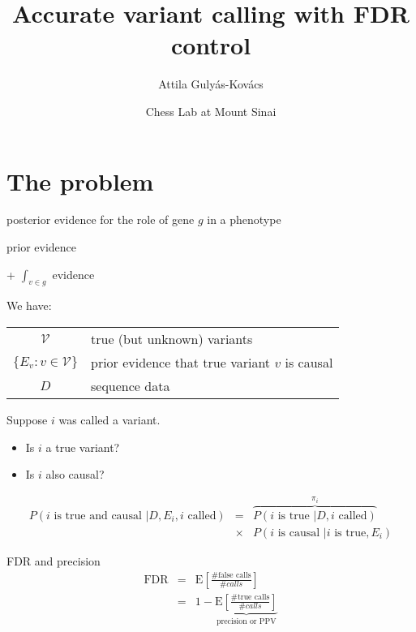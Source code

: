 \documentclass{beamer} %
\title{Accurate variant calling with FDR control}
\author{Attila Guly\'{a}s-Kov\'{a}cs}
\date{Chess Lab at Mount Sinai}
\begin{document}
\begin{frame}[plain, label=title]
\maketitle
\end{frame}

\section{The problem}

\begin{frame}
posterior evidence for the role of gene \(g\) in a phenotype

prior evidence

+ \(\int_{v\in g}\) evidence
\end{frame}

\begin{frame}{}

We have:

\begin{tabular}{cl}
\(\mathcal{V}\) & true (but unknown) variants \\
\(\{E_v : v \in \mathcal{V} \} \) & prior evidence that true variant \(v\) is causal \\
\(D\) & sequence data \\
\end{tabular}

\bigskip

Suppose \(i\) was called a variant.
\begin{itemize}
\item Is \(i\) a true variant?
\item Is \(i\) also causal?
\end{itemize}

\bigskip

\begin{eqnarray*}
P(i \text{ is true and causal } | D, E_i, i \text{ called})
&=&
\overbrace{P(i \text{ is true } | D, i \text{ called})}^{\pi_i} \\
&\times&
P(i \text{ is causal } | i \text{ is true}, E_i)
\end{eqnarray*}
\end{frame}

\begin{frame}{FDR and precision}
\begin{eqnarray*}
\text{FDR} &=& \text{E} \left[ \frac{\text{\# false calls}}{\# calls} \right] \\
&=& 1 - \underbrace{\text{E} \left[ \frac{\text{\# true calls}}{\# calls}
\right]}_{\text{precision or PPV}}
\end{eqnarray*}
\end{frame}
\end{document}
